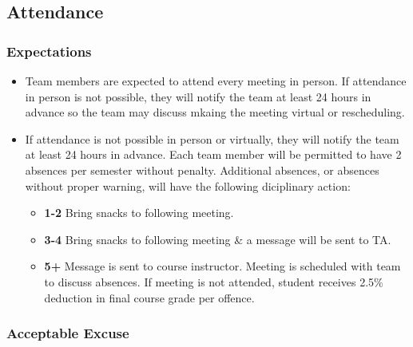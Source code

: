 \documentclass{article}
\begin{document}
\begin{itemize}
\subsection*{Attendance}

\subsubsection*{Expectations}
\begin{itemize}
\item Team members are expected to attend every meeting in person. If attendance in person is not possible, they will notify the team at least 24 hours 
in advance so the team may discuss mkaing the meeting virtual or rescheduling.
\item If attendance is not possible in person or virtually, they will notify the team at least 24 hours in advance. Each team member will be permitted to have 2 absences per semester 
without penalty. Additional absences, or absences without proper warning, will have the following diciplinary action:

\begin{itemize}
  \item[] \textbf{1-2} Bring snacks to following meeting.
  \item[] \textbf{3-4} Bring snacks to following meeting \& a message will be sent to TA.
  \item[] \textbf{5+} Message is sent to course instructor. Meeting is scheduled with team to discuss absences. If meeting is not attended, student receives 2.5\% deduction in final course grade per offence.
\end{itemize}
\end{itemize}

\subsubsection*{Acceptable Excuse}


\end{itemize}
\end{document}
